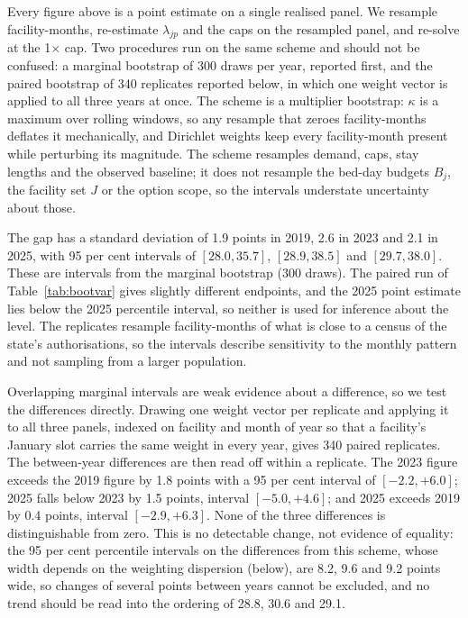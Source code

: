 Every figure above is a point estimate on a single realised panel. We resample
facility-months, re-estimate $\lambda_{jp}$ and the caps on the resampled panel,
and re-solve at the 1$\times$ cap. Two procedures run on the same scheme and
should not be confused: a marginal bootstrap of 300 draws per year, reported
first, and the paired bootstrap of 340 replicates reported below, in which one
weight vector is applied to all three years at once. The scheme is a multiplier
bootstrap: $\kappa$ is a maximum over rolling windows, so any resample that
zeroes facility-months deflates it mechanically, and Dirichlet weights keep every
facility-month present while perturbing its magnitude. The scheme resamples demand, caps, stay
lengths and the observed baseline; it does not resample the bed-day budgets $B_j$, the facility set
$J$ or the option scope, so the intervals understate uncertainty about those.

The gap has a standard deviation of 1.9 points in 2019, 2.6 in 2023 and 2.1 in
2025, with 95 per cent intervals of $[28.0, 35.7]$, $[28.9, 38.5]$ and
$[29.7, 38.0]$. These are intervals from the marginal bootstrap (300 draws). The paired run of Table~\ref{tab:bootvar} gives slightly different endpoints, and the 2025 point estimate lies below the 2025 percentile interval, so neither is used for inference about the level. The replicates resample facility-months of what is close to a census of the state's authorisations, so the intervals describe sensitivity to the monthly pattern and not sampling from a larger population.

Overlapping marginal intervals are weak evidence about a difference, so we test
the differences directly. Drawing one weight vector per replicate and applying it
to all three panels, indexed on facility and month of year so that a facility's
January slot carries the same weight in every year, gives 340 paired replicates.
The between-year differences are then read off within a replicate. The 2023
figure exceeds the 2019 figure by 1.8 points with a 95 per cent interval of
$[-2.2, +6.0]$; 2025 falls below 2023 by 1.5 points, interval $[-5.0, +4.6]$; and
2025 exceeds 2019 by 0.4 points, interval $[-2.9, +6.3]$. None of the three
differences is distinguishable from zero. This is no detectable change, not evidence of equality: the
95 per cent percentile intervals on the differences from this scheme, whose width depends on the weighting dispersion (below), are 8.2, 9.6 and 9.2 points wide, so changes of several points
between years cannot be excluded, and no trend should be read into the ordering of 28.8, 30.6 and 29.1.

